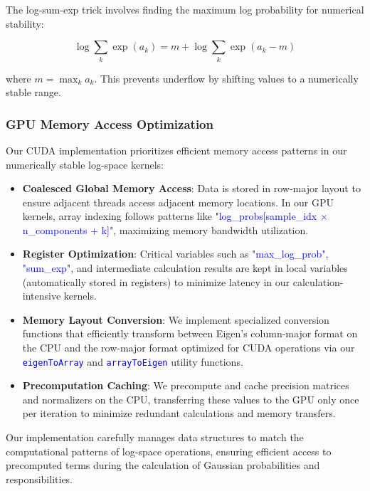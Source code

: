 \documentclass[conference]{IEEEtran}
\begin{document}
The log-sum-exp trick involves finding the maximum log probability for numerical stability:

\begin{equation}
\log\sum_{k} \exp(a_k) = m + \log\sum_{k} \exp(a_k - m)
\end{equation}

\noindent where $m = \max_k a_k$. This prevents underflow by shifting values to a numerically stable range.

\subsubsection{GPU Memory Access Optimization}

Our CUDA implementation prioritizes efficient memory access patterns in our numerically stable log-space kernels:

\begin{itemize}
    \item \textbf{Coalesced Global Memory Access}: Data is stored in row-major layout to ensure adjacent threads access adjacent memory locations. In our GPU kernels, array indexing follows patterns like "\textcolor{blue}{log\_probs[sample\_idx $\times$ n\_components + k]}", maximizing memory bandwidth utilization.
    
    \item \textbf{Register Optimization}: Critical variables such as "\textcolor{blue}{max\_log\_prob", "sum\_exp}", and intermediate calculation results are kept in local variables (automatically stored in registers) to minimize latency in our calculation-intensive kernels.
    
    \item \textbf{Memory Layout Conversion}: We implement specialized conversion functions that efficiently transform between Eigen's column-major format on the CPU and the row-major format optimized for CUDA operations via our \texttt{\textcolor{blue}{eigenToArray}} and \texttt{\textcolor{blue}{arrayToEigen}} utility functions.
    
    \item \textbf{Precomputation Caching}: We precompute and cache precision matrices and normalizers on the CPU, transferring these values to the GPU only once per iteration to minimize redundant calculations and memory transfers.
\end{itemize}

Our implementation carefully manages data structures to match the computational patterns of log-space operations, ensuring efficient access to precomputed terms during the calculation of Gaussian probabilities and responsibilities.
\end{document}
